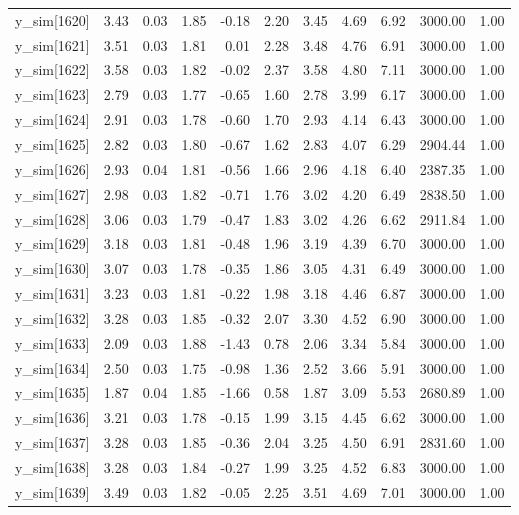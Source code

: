 \begin{table}[ht]
\begin{tabular}{rrrrrrrrrrr}
  y\_sim[1620] & 3.43 & 0.03 & 1.85 & -0.18 & 2.20 & 3.45 & 4.69 & 6.92 & 3000.00 & 1.00 \\ 
  y\_sim[1621] & 3.51 & 0.03 & 1.81 & 0.01 & 2.28 & 3.48 & 4.76 & 6.91 & 3000.00 & 1.00 \\ 
  y\_sim[1622] & 3.58 & 0.03 & 1.82 & -0.02 & 2.37 & 3.58 & 4.80 & 7.11 & 3000.00 & 1.00 \\ 
  y\_sim[1623] & 2.79 & 0.03 & 1.77 & -0.65 & 1.60 & 2.78 & 3.99 & 6.17 & 3000.00 & 1.00 \\ 
  y\_sim[1624] & 2.91 & 0.03 & 1.78 & -0.60 & 1.70 & 2.93 & 4.14 & 6.43 & 3000.00 & 1.00 \\ 
  y\_sim[1625] & 2.82 & 0.03 & 1.80 & -0.67 & 1.62 & 2.83 & 4.07 & 6.29 & 2904.44 & 1.00 \\ 
  y\_sim[1626] & 2.93 & 0.04 & 1.81 & -0.56 & 1.66 & 2.96 & 4.18 & 6.40 & 2387.35 & 1.00 \\ 
  y\_sim[1627] & 2.98 & 0.03 & 1.82 & -0.71 & 1.76 & 3.02 & 4.20 & 6.49 & 2838.50 & 1.00 \\ 
  y\_sim[1628] & 3.06 & 0.03 & 1.79 & -0.47 & 1.83 & 3.02 & 4.26 & 6.62 & 2911.84 & 1.00 \\ 
  y\_sim[1629] & 3.18 & 0.03 & 1.81 & -0.48 & 1.96 & 3.19 & 4.39 & 6.70 & 3000.00 & 1.00 \\ 
  y\_sim[1630] & 3.07 & 0.03 & 1.78 & -0.35 & 1.86 & 3.05 & 4.31 & 6.49 & 3000.00 & 1.00 \\ 
  y\_sim[1631] & 3.23 & 0.03 & 1.81 & -0.22 & 1.98 & 3.18 & 4.46 & 6.87 & 3000.00 & 1.00 \\ 
  y\_sim[1632] & 3.28 & 0.03 & 1.85 & -0.32 & 2.07 & 3.30 & 4.52 & 6.90 & 3000.00 & 1.00 \\ 
  y\_sim[1633] & 2.09 & 0.03 & 1.88 & -1.43 & 0.78 & 2.06 & 3.34 & 5.84 & 3000.00 & 1.00 \\ 
  y\_sim[1634] & 2.50 & 0.03 & 1.75 & -0.98 & 1.36 & 2.52 & 3.66 & 5.91 & 3000.00 & 1.00 \\ 
  y\_sim[1635] & 1.87 & 0.04 & 1.85 & -1.66 & 0.58 & 1.87 & 3.09 & 5.53 & 2680.89 & 1.00 \\ 
  y\_sim[1636] & 3.21 & 0.03 & 1.78 & -0.15 & 1.99 & 3.15 & 4.45 & 6.62 & 3000.00 & 1.00 \\ 
  y\_sim[1637] & 3.28 & 0.03 & 1.85 & -0.36 & 2.04 & 3.25 & 4.50 & 6.91 & 2831.60 & 1.00 \\ 
  y\_sim[1638] & 3.28 & 0.03 & 1.84 & -0.27 & 1.99 & 3.25 & 4.52 & 6.83 & 3000.00 & 1.00 \\ 
  y\_sim[1639] & 3.49 & 0.03 & 1.82 & -0.05 & 2.25 & 3.51 & 4.69 & 7.01 & 3000.00 & 1.00 \\ 

\end{tabular}
\end{table}
